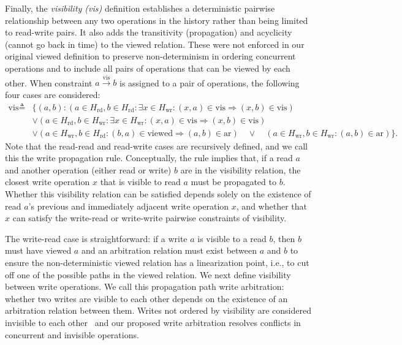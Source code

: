   Finally, the \textit{visibility (vis)} definition establishes a
  deterministic pairwise
  relationship between any two operations in the history
  rather than being limited to read-write pairs.
  It also adds the transitivity (propagation) and acyclicity
  (cannot go back in time) to the viewed relation.
  These were not enforced in our original viewed definition to preserve
  non-determinism in ordering concurrent operations and to include all pairs of
  operations that can be viewed by each other.
  When constraint $a \xrightarrow{\text{vis}} b$ is assigned to a pair
  of operations,
  the following four cases are considered:
  \begin{align*}
	  \text{vis} \triangleq & \{(a, b) : (a \in H_\text{rd}, b \in H_\text{rd} : \exists x \in
      H_\text{wr}: (x, a) \in \text{vis} \Rightarrow (x, b) \in \text{vis}) \\
      & \lor
      (a \in H_\text{rd}, b \in H_\text{wr} : \exists x \in
      H_\text{wr}: (x, a) \in \text{vis} \Rightarrow (x, b) \in \text{vis}) \\
      & \lor
      (a \in H_\text{wr}, b \in H_\text{rd} : (b, a) \in \text{viewed}
      \Rightarrow (a, b) \in \text{ar})  \quad \lor \quad
    (a \in H_\text{wr}, b \in H_\text{wr} : (a, b) \in \text{ar})\}.
  \end{align*}
  Note that the read-read and read-write cases are recursively
  defined,
  and we call this the
  write propagation rule. Conceptually, the rule implies that, if a read $a$
  and another operation (either read or write) $b$ are in the
  visibility relation,
  the closest write operation $x$ that is visible to read $a$ must
  be propagated to $b$. Whether this visibility relation can be satisfied
  depends solely on the existence of read $a$'s previous and
  immediately adjacent write operation $x$, and whether
  that $x$ can satisfy the write-read or write-write pairwise
  constraints of visibility.

  The write-read case is straightforward:
  if a write $a$ is visible to a read $b$, then $b$
  must have viewed $a$ and an arbitration relation must exist between
  $a$ and $b$
  to ensure the non-deterministic viewed relation has a
  linearization point, i.e., to cut off one of the possible paths in
  the viewed relation.
  We next define visibility between write operations. We call this
  propagation path write arbitration: whether two writes are visible to each other depends on the
  existence of an arbitration relation between them.
  Writes not ordered by visibility are considered invisible to each
  other~\cite{viotti2016consistency}
  and our proposed write arbitration resolves conflicts in concurrent and invisible operations.

